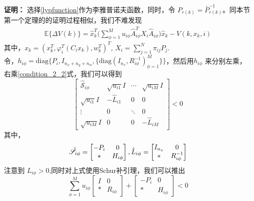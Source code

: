 	{\bf 证明：} 选择\eqref{lypfunction}作为李雅普诺夫函数，同时，令 $P_{r(k)}=\bar{P}^{-1}_{r(k)}$。同本节第一个定理的的证明过程相似，我们不难发现
	\begin{equation}
	\begin{split}
	\mathbb{E}\{\varDelta V(k)\}=\hat{x}^{T}_{k} \Big( \sum_{\phi=1}^{M}u_{i\phi}\hat{A}^{T}_{i\phi}X_{i}\hat{A}_{i\phi}\Big) \hat{x}_{k} -V(k,x_k,i)
	\end{split}
	\end{equation}
	其中，$\hat{x}_{k}=(x^{T}_{k},\varphi^{T}_{i}(C_{i}x_{k}),w^{T}_{k})^{T}$, $ X_{i}=\sum_{j=1}^{N}\pi_{ij}P_{j}$. \\
	令，$h_{i\phi} = \mathrm{diag}\Big\{P_{i}, I_{n_x+n_y+n_w},\{\mathrm{diag}(I_{n_x},R^{-1}_{i\phi})^{M}_{\phi=1} \} \Big\}$，然后用$h_{i\phi}$ 来分别左乘，右乘\eqref{condition_2_2}式，我们可以得到
	\begin{equation}\nonumber
	\begin{bmatrix} 
	\hat{\mathscr{S}}_{i\phi}&
	\sqrt{u_{i1}}I&
	\cdots&
	\sqrt{u_{iM}}I\\
	\sqrt{u_{i1}}I&-\hat{L}_{i1}&0&0\\ 
	\vdots&0&\ddots&0\\
	\sqrt{u_{iM}}I&0&0&
	-\hat{L}_{iM}
	\end{bmatrix} <0
	\end{equation}
	其中，
	\begin{equation} \notag
	\begin{aligned}
	\hat{\mathscr{S}}_{i\phi}=\begin{bmatrix}
	-P_{i }&0\\
	*&H_{i\phi}
	\end{bmatrix},
	\hat{L}_{i\phi} = \begin{bmatrix}
	I_{n_x}&0\\
	*&R^{-1}_{i\phi}
	\end{bmatrix}
	\end{aligned}
	\end{equation}
	注意到 $L_{i\phi}>0$,同时对上式使用Schur补引理，我们可以推出
	\begin{equation} \label{cons2}
	\sum_{\phi=1}^{M}u_{i\phi} \begin{bmatrix}
	I&0\\
	*&R_{i\phi}
	\end{bmatrix} + \begin{bmatrix}
	-P_{i }&0\\
	*&H_{i\phi}
	\end{bmatrix} <0
	\end{equation}

